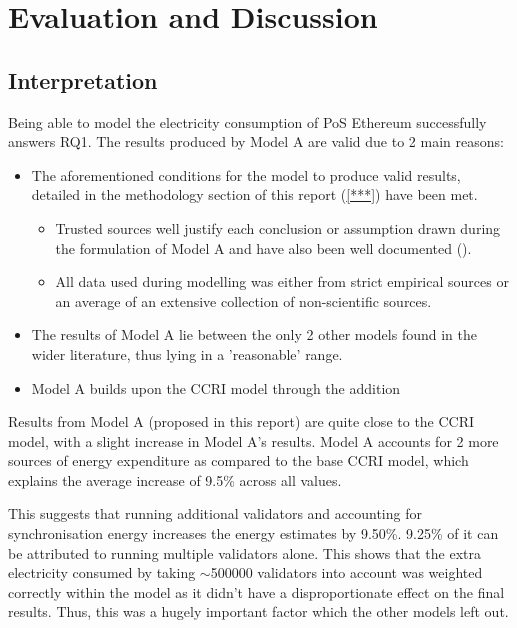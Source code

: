 \section{Evaluation and Discussion}

\subsection{Interpretation}

Being able to model the electricity consumption of PoS Ethereum successfully answers RQ1. The results produced by Model A are valid due to 2 main reasons:
\begin{itemize}
    \item The aforementioned conditions for the model to produce valid results, detailed in the methodology section of this report (\ref{***}) have been met. 
    \begin{itemize}
        \item Trusted sources well justify each conclusion or assumption drawn during the formulation of Model A and have also been well documented ().
        \item All data used during modelling was either from strict empirical sources or an average of an extensive collection of non-scientific sources.
    \end{itemize}
    \item The results of Model A lie between the only 2 other models found in the wider literature, thus lying in a 'reasonable' range.
    \item Model A builds upon the CCRI model through the addition
\end{itemize}

Results from Model A (proposed in this report) are quite close to the CCRI model, with a slight increase in Model A's results. Model A accounts for 2 more sources of energy expenditure as compared to the base CCRI model, which explains the average increase of 9.5\% across all values. 

This suggests that running additional validators and accounting for synchronisation energy increases the energy estimates by 9.50\%. 9.25\% of it can be attributed to running multiple validators alone. This shows that the extra electricity consumed by taking $\sim$500000 validators into account was weighted correctly within the model as it didn't have a disproportionate effect on the final results. Thus, this was a hugely important factor which the other models left out. 

